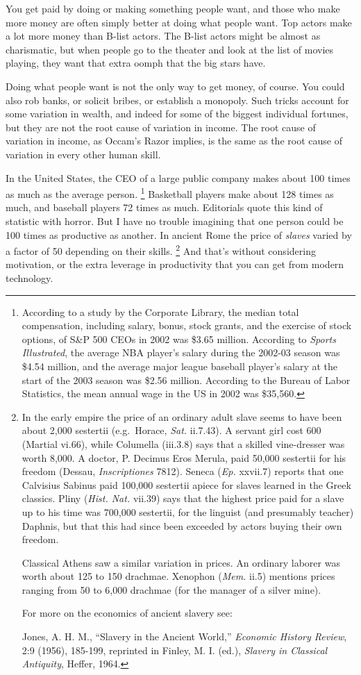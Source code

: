 \documentclass[12pt]{book}
\begin{document}
You get paid by doing or making something people want, and those who
make more money are often simply better at doing what people want. Top
actors make a lot more money than B-list actors. The B-list actors might
be almost as charismatic, but when people go to the theater and look at
the list of movies playing, they want that extra oomph that the big
stars have.

Doing what people want is not the only way to get money, of course. You
could also rob banks, or solicit bribes, or establish a monopoly. Such
tricks account for some variation in wealth, and indeed for some of the
biggest individual fortunes, but they are not the root cause of
variation in income. The root cause of variation in income, as Occam's
Razor implies, is the same as the root cause of variation in every other
human skill.

In the United States, the CEO of a large public company makes about 100
times as much as the average person. \footnote{According to a study by the Corporate Library, the median total
compensation, including salary, bonus, stock grants, and the exercise of
stock options, of S\&P 500 CEOs in 2002 was \$3.65 million. According to
\emph{Sports Illustrated}, the average NBA player's salary during the
2002-03 season was \$4.54 million, and the average major league baseball
player's salary at the start of the 2003 season was \$2.56 million.
According to the Bureau of Labor Statistics, the mean annual wage in the
US in 2002 was \$35,560.} Basketball
players make about 128 times as much, and baseball players 72 times as
much. Editorials quote this kind of statistic with horror. But I have no
trouble imagining that one person could be 100 times as productive as
another. In ancient Rome the price of \emph{slaves} varied by a factor
of 50 depending on their skills. \footnote{In the early empire the price of an ordinary adult slave seems
to have been about 2,000 sestertii (e.g.~Horace, \emph{Sat.} ii.7.43). A
servant girl cost 600 (Martial vi.66), while Columella (iii.3.8) says
that a skilled vine-dresser was worth 8,000. A doctor, P. Decimus Eros
Merula, paid 50,000 sestertii for his freedom (Dessau,
\emph{Inscriptiones} 7812). Seneca (\emph{Ep.} xxvii.7) reports that one
Calvisius Sabinus paid 100,000 sestertii apiece for slaves learned in
the Greek classics. Pliny (\emph{Hist. Nat.} vii.39) says that the
highest price paid for a slave up to his time was 700,000 sestertii, for
the linguist (and presumably teacher) Daphnis, but that this had since
been exceeded by actors buying their own freedom.

Classical Athens saw a similar variation in prices. An ordinary laborer
was worth about 125 to 150 drachmae. Xenophon (\emph{Mem.} ii.5)
mentions prices ranging from 50 to 6,000 drachmae (for the manager of a
silver mine).

For more on the economics of ancient slavery see:

Jones, A. H. M., ``Slavery in the Ancient World,'' \emph{Economic
History Review}, 2:9 (1956), 185-199, reprinted in Finley, M. I. (ed.),
\emph{Slavery in Classical Antiquity}, Heffer, 1964.} And that's
without considering motivation, or the extra leverage in productivity
that you can get from modern technology.
\end{document}
